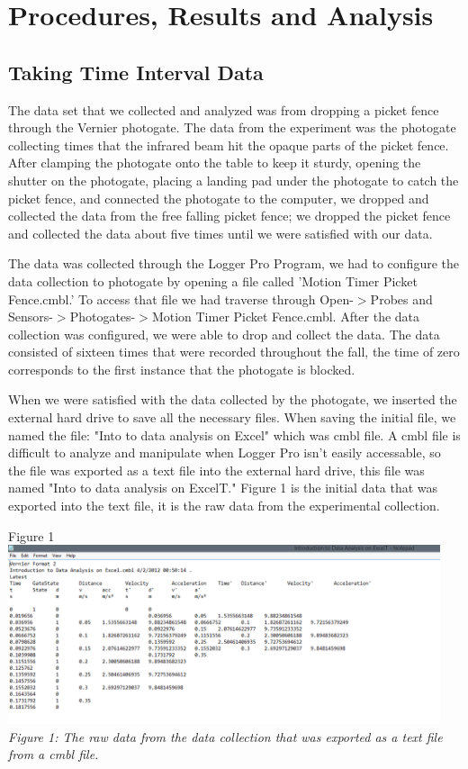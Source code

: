 \documentclass[aps,letterpaper,11pt]{revtex4}
\begin{document}
\section{Procedures, Results and Analysis}

\subsection{Taking Time Interval Data}

The data set that we collected and analyzed was from dropping a picket fence through the Vernier photogate. The data from the experiment was the photogate collecting times that the infrared beam hit the opaque parts of the picket fence. After clamping the photogate onto the table to keep it sturdy, opening the shutter on the photogate, placing a landing pad under the photogate to catch the picket fence, and connected the photogate to the computer, we dropped and collected the data from the free falling picket fence; we dropped the picket fence and collected the data about five times until we were satisfied with our data. 

The data was collected through the Logger Pro Program, we had to configure the data collection to photogate by opening a file called 'Motion Timer Picket Fence.cmbl.' To access that file we had traverse through Open-$>$Probes and Sensors-$>$Photogates-$>$Motion Timer Picket Fence.cmbl. After the data collection was configured, we were able to drop and collect the data. The data consisted of sixteen times that were recorded throughout the fall, the time of zero corresponds to the first instance that the photogate is blocked. 

When we were satisfied with the data collected by the photogate, we inserted the external hard drive to save all the necessary files. When saving the initial file, we named the file: "Into to data analysis on Excel" which was cmbl file. A cmbl file is difficult to analyze and manipulate when Logger Pro isn't easily accessable, so the file was exported as a text file into the external hard drive, this file was named "Into to data analysis on ExcelT." Figure 1 is the initial data that was exported into the text file, it is the raw data from the experimental collection.  

\newpage

\begin{center}
Figure 1\\
\vspace{5mm}
\includegraphics[width=5in]{DataFromCollection.png}\\
\textit{Figure 1: The raw data from the data collection that was exported as a text file from a cmbl file.}
\end{center}
\end{document}
